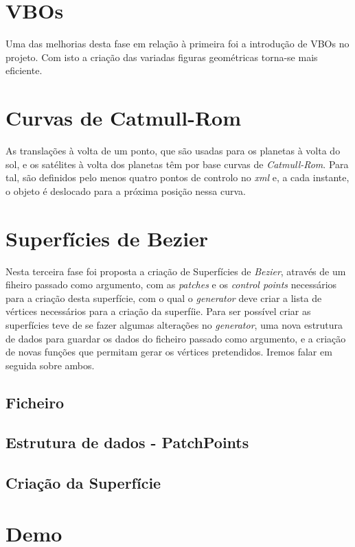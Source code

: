 \chapter{VBOs}
Uma das melhorias desta fase em relação à primeira foi a introdução de VBOs no projeto. Com isto a criação das variadas figuras geométricas torna-se  mais eficiente.


\chapter{Curvas de Catmull-Rom}

As translações à volta de um ponto, que são usadas para os planetas à volta do sol, e os satélites  à volta dos planetas têm por base curvas de \textit{Catmull-Rom}. Para tal, são definidos pelo menos quatro pontos de controlo no \textit{xml} e, a cada instante, o objeto é deslocado para a próxima posição nessa curva.

\chapter{Superfícies de Bezier}
Nesta terceira fase foi proposta a criação de Superfícies de \textit{Bezier}, através de um fiheiro passado como argumento, com as \textit{patches} e os \textit{control points} necessários para a criação desta superfície, com o qual o \textit{generator} deve criar a lista de vértices necessários para a criação da superfíie. Para ser possível criar as superfícies teve de se fazer algumas alterações no \textit{generator}, uma nova estrutura de dados para guardar os dados do ficheiro passado como argumento, e a criação de novas funções que permitam gerar os vértices pretendidos. Iremos falar em seguida sobre ambos.

\section{Ficheiro}


\section{Estrutura de dados - PatchPoints}

\section{Criação da Superfície}


\chapter{Demo}